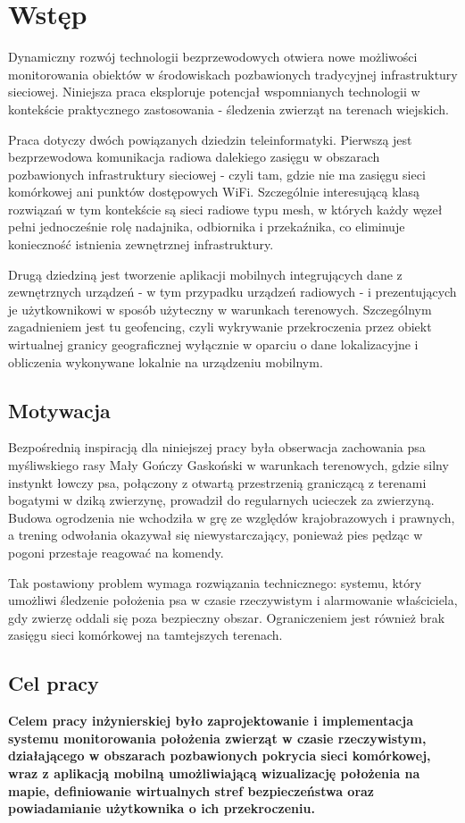 \newpage
\section{Wstęp}
\label{sec:wstep}
Dynamiczny rozwój technologii bezprzewodowych otwiera nowe możliwości monitorowania obiektów w 
środowiskach pozbawionych tradycyjnej infrastruktury sieciowej. Niniejsza praca eksploruje 
potencjał wspomnianych technologii w kontekście praktycznego zastosowania - śledzenia zwierząt na terenach wiejskich.

Praca dotyczy dwóch powiązanych dziedzin teleinformatyki. Pierwszą jest bezprzewodowa komunikacja
radiowa dalekiego zasięgu w obszarach pozbawionych infrastruktury sieciowej - czyli tam, gdzie nie ma
zasięgu sieci komórkowej ani punktów dostępowych WiFi. Szczególnie interesującą klasą rozwiązań
w tym kontekście są sieci radiowe typu mesh, w których każdy węzeł pełni jednocześnie rolę nadajnika,
odbiornika i przekaźnika, co eliminuje konieczność istnienia zewnętrznej infrastruktury.

Drugą dziedziną jest tworzenie aplikacji mobilnych integrujących dane z zewnętrznych urządzeń -
w tym przypadku urządzeń radiowych - i prezentujących je użytkownikowi w sposób użyteczny
w warunkach terenowych. Szczególnym zagadnieniem jest tu geofencing, czyli wykrywanie przekroczenia
przez obiekt wirtualnej granicy geograficznej wyłącznie w oparciu o dane lokalizacyjne i obliczenia
wykonywane lokalnie na urządzeniu mobilnym.

\subsection*{Motywacja}

Bezpośrednią inspiracją dla niniejszej pracy była obserwacja zachowania psa myśliwskiego rasy 
Mały Gończy Gaskoński w warunkach terenowych, gdzie silny
instynkt łowczy psa, połączony z otwartą przestrzenią graniczącą z terenami bogatymi w dziką
zwierzynę, prowadził do regularnych ucieczek za zwierzyną. Budowa ogrodzenia nie wchodziła w grę
ze względów krajobrazowych i prawnych, a trening odwołania okazywał się niewystarczający, ponieważ
pies pędząc w pogoni przestaje reagować na komendy.

Tak postawiony problem wymaga rozwiązania technicznego: systemu, który umożliwi śledzenie położenia
psa w czasie rzeczywistym i alarmowanie właściciela, gdy zwierzę oddali się poza bezpieczny obszar.
Ograniczeniem jest również brak zasięgu sieci komórkowej na tamtejszych terenach.

\subsection*{Cel pracy}

\textbf{Celem pracy inżynierskiej było zaprojektowanie i implementacja systemu monitorowania
położenia zwierząt w czasie rzeczywistym, działającego w obszarach pozbawionych pokrycia sieci
komórkowej, wraz z aplikacją mobilną umożliwiającą wizualizację położenia na mapie, definiowanie
wirtualnych stref bezpieczeństwa oraz powiadamianie użytkownika o ich przekroczeniu.}
